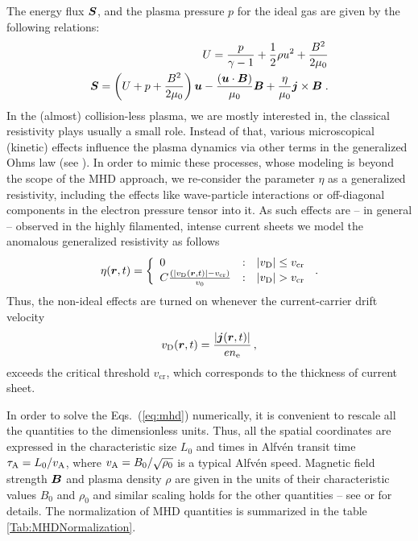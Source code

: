 The energy flux $\boldsymbol{S}$, and the plasma pressure $p$ for the ideal gas are given by the following relations:
\begin{eqnarray}
U=\frac{p}{\gamma-1}+\frac{1}{2}\rho u^2+\frac{B^2}{2\mu_0}\\
\boldsymbol{S}=\left(U+p+\frac{B^2}{2\mu_0}\right)\boldsymbol{u}- \frac{(\boldsymbol{u}\cdot\boldsymbol{B})}{\mu_0}\boldsymbol{B}+\frac{\eta}{\mu_0}\boldsymbol{j}\times\boldsymbol{B} \;.
\end{eqnarray}
In the (almost) collision-less plasma, we are mostly interested in, the classical resistivity plays usually a small role. Instead of that, various microscopical
(kinetic) effects influence the plasma dynamics via other terms in the generalized Ohms law (see \cite{Buchner+Elkina:2006}). In order to mimic these
processes, whose modeling is beyond the scope of the MHD approach, we re-consider the parameter $\eta$ as a generalized resistivity, including the effects like
wave-particle interactions or off-diagonal components in the electron pressure tensor into it. As such effects are -- in general -- observed in the highly
filamented, intense current sheets we model the anomalous generalized resistivity as follows
\begin{equation}
\eta(\vct r,t)=\left\{
  \begin{array}{lll}
    0 & : & |v_{\rm D}|\le v_\mathrm{cr}\\
    C\frac{\left(|v_{\rm D}(\vct r,t)|-v_\mathrm{cr}\right)}{v_0}& : &
    |v_{\rm D}|> v_\mathrm{cr}
  \end{array}
  \right.\,.
  \label{eq:eta}
\end{equation}
Thus, the non-ideal effects are turned on whenever the current-carrier drift velocity
\begin{equation}
 v_{\rm D}(\boldsymbol{r},t)=\frac{|\boldsymbol{j}(\boldsymbol{r},t)|}{e n_\mathrm{e}}\,,
\end{equation}
exceeds the critical threshold $v_\mathrm{cr}$, which corresponds to the thickness of current sheet.

In order to solve the Eqs.~(\ref{eq:mhd}) numerically, it is convenient to rescale all the quantities to the dimensionless units. Thus, all the spatial
coordinates are expressed in the characteristic size $L_0$ and times in Alfv\'en transit time $\tau_{\rm A}=L_0/v_{\rm A}$, where $v_{\rm A}=B_0/\sqrt{\rho_0}$
is a typical Alfv\'en speed. Magnetic field strength $\boldsymbol{B}$ and plasma density $\rho$ are given in the units of their characteristic values $B_0$ and $\rho_0$
and similar scaling holds for the other quantities -- see \cite{Kliem+:2000} or \cite{Barta+:2011a} for details. The normalization of MHD quantities is
summarized in the table \ref{Tab:MHDNormalization}.

